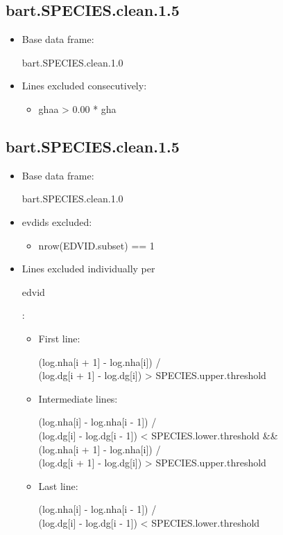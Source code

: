 \subsection{bart.SPECIES.clean.1.5}

\begin{itemize}
\item Base data frame: \begin{rcode} bart.SPECIES.clean.1.0 \end{rcode}
\item Lines excluded consecutively:
  \begin{itemize}
  \item \begin{rcode} ghaa > 0.00 * gha \end{rcode}
  \end{itemize}
\end{itemize}

\subsection{bart.SPECIES.clean.1.5}

\begin{itemize}
\item Base data frame: \begin{rcode} bart.SPECIES.clean.1.0 \end{rcode}
\item evdids excluded:
  \begin{itemize}
  \item \begin{rcode} nrow(EDVID.subset) == 1 \end{rcode}
  \end{itemize}
\item Lines excluded individually per \begin{rcode} edvid \end{rcode}:
  \begin{itemize}
  \item First line: \\
    \begin{rcode} (log.nha[i + 1] - log.nha[i]) / \\ (log.dg[i + 1] - log.dg[i]) > SPECIES.upper.threshold \end{rcode}
  \item Intermediate lines: \\
    \begin{rcode} (log.nha[i] - log.nha[i - 1]) / \\ (log.dg[i] - log.dg[i - 1]) < SPECIES.lower.threshold  \&\& \\
      (log.nha[i + 1] - log.nha[i]) / \\ (log.dg[i + 1] - log.dg[i]) > SPECIES.upper.threshold \end{rcode}
  \item Last line: \\
    \begin{rcode} (log.nha[i] - log.nha[i - 1]) / \\ (log.dg[i] - log.dg[i - 1]) < SPECIES.lower.threshold \end{rcode}
  \end{itemize}
\end{itemize}


